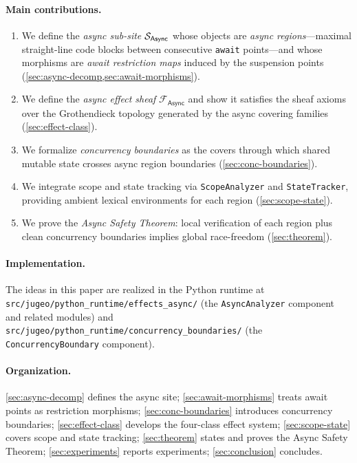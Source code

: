 \documentclass[11pt]{article}
\newcommand{\Async}{\mathsf{Async}}          %
\newcommand{\asyncSite}{\Site_{\Async}}      %
\newcommand{\asyncSheaf}{\mathcal{F}_{\Async}} %
\begin{document}
\paragraph{Main contributions.}
\begin{enumerate}
  \item We define the \emph{async sub-site} $\asyncSite$ whose objects are
        \emph{async regions}---maximal straight-line code blocks between
        consecutive \texttt{await} points---and whose morphisms are
        \emph{await restriction maps} induced by the suspension points
        (\cref{sec:async-decomp,sec:await-morphisms}).

  \item We define the \emph{async effect sheaf} $\asyncSheaf$ and show it
        satisfies the sheaf axioms over the Grothendieck topology generated by
        the async covering families (\cref{sec:effect-class}).

  \item We formalize \emph{concurrency boundaries} as the covers through which
        shared mutable state crosses async region boundaries
        (\cref{sec:conc-boundaries}).

  \item We integrate scope and state tracking via \texttt{ScopeAnalyzer} and
        \texttt{StateTracker}, providing ambient lexical environments for each
        region (\cref{sec:scope-state}).

  \item We prove the \emph{Async Safety Theorem}: local verification of each
        region plus clean concurrency boundaries implies global race-freedom
        (\cref{sec:theorem}).
\end{enumerate}

\paragraph{Implementation.}
The ideas in this paper are realized in the \JuGeo{} Python runtime at
\texttt{src/jugeo/python\_runtime/effects\_async/} (the \texttt{AsyncAnalyzer}
component and related modules) and
\texttt{src/jugeo/python\_runtime/concurrency\_boundaries/} (the
\texttt{ConcurrencyBoundary} component).

\paragraph{Organization.}
\cref{sec:async-decomp} defines the async site;
\cref{sec:await-morphisms} treats await points as restriction morphisms;
\cref{sec:conc-boundaries} introduces concurrency boundaries;
\cref{sec:effect-class} develops the four-class effect system;
\cref{sec:scope-state} covers scope and state tracking;
\cref{sec:theorem} states and proves the Async Safety Theorem;
\cref{sec:experiments} reports experiments;
\cref{sec:conclusion} concludes.
\end{document}
